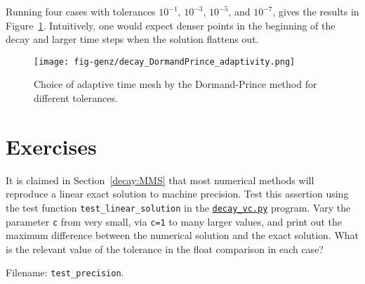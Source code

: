 \documentclass[graybox,sectrefs,envcountresetchap,open=right,final]{svmonodo}
\makeatletter
\newenvironment{doconceexercise}{}{}
\newcounter{doconceexercisecounter}%
\newcommand\listofexercises{
\chapter*{List of Exercises, Problems, and Projects
          \@mkboth{List of Exercises, Problems, and Projects}{List of Exercises, Problems, and Projects}}
\markboth{List of Exercises, Problems, and Projects}{List of Exercises, Problems, and Projects}
\@starttoc{loe}
}
\makeatother
\begin{document}
Running four cases with tolerances $10^{-1}$, $10^{-3}$, $10^{-5}$,
and $10^{-7}$, gives the results in Figure~\ref{decay:odespy:fig2}.
Intuitively, one would expect denser points in the beginning of
the decay and larger time steps when the solution flattens out.

\begin{figure}[!ht]  %
  \centerline{\texttt{[image: fig-genz/decay\_DormandPrince\_adaptivity.png]}}
  \caption{
  Choice of adaptive time mesh by the Dormand-Prince method for different tolerances. \label{decay:odespy:fig2}
  }
\end{figure}

\section{Exercises}

\begin{doconceexercise}

                
\label{decay:fd2:exer:precision}

It is claimed in Section~\ref{decay:MMS} that most numerical methods will
reproduce a linear exact solution to machine precision. Test this
assertion using the test function \Verb!test_linear_solution! in the
\href{{http://tinyurl.com/ofkw6kc/genz/decay_vc.py}}{\nolinkurl{decay_vc.py}} program.
Vary the parameter \texttt{c} from very small, via \texttt{c=1} to many larger values,
and print out the maximum difference between the numerical solution
and the exact solution. What is the relevant value of the tolerance
in the float comparison in each case?

\noindent Filename: \Verb!test_precision!.

\end{doconceexercise}
\end{document}
